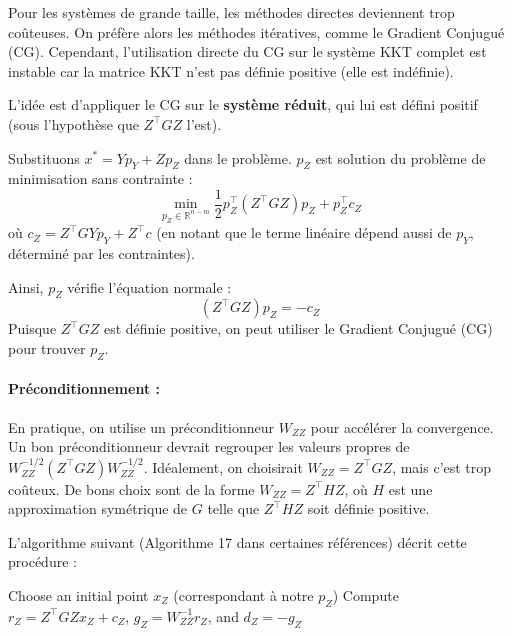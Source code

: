Pour les systèmes de grande taille, les méthodes directes deviennent trop coûteuses. On préfère alors les méthodes itératives, comme le Gradient Conjugué (CG).
Cependant, l'utilisation directe du CG sur le système KKT complet est instable car la matrice KKT n'est pas définie positive (elle est indéfinie).

L'idée est d'appliquer le CG sur le \textbf{système réduit}, qui lui est défini positif (sous l'hypothèse que $Z^\top G Z$ l'est).

Substituons $x^* = Y p_Y + Z p_Z$ dans le problème.
$p_Z$ est solution du problème de minimisation sans contrainte :
\begin{equation}
    \min_{p_Z \in \mathbb{R}^{n-m}} \frac{1}{2} p_Z^\top (Z^\top G Z) p_Z + p_Z^\top c_Z
\end{equation}
où $c_Z = Z^\top G Y p_Y + Z^\top c$ (en notant que le terme linéaire dépend aussi de $p_Y$, déterminé par les contraintes).

Ainsi, $p_Z$ vérifie l'équation normale :
\begin{equation}
    (Z^\top G Z) p_Z = -c_Z
\end{equation}
Puisque $Z^\top G Z$ est définie positive, on peut utiliser le Gradient Conjugué (CG) pour trouver $p_Z$.

\paragraph{Préconditionnement :}
En pratique, on utilise un préconditionneur $W_{ZZ}$ pour accélérer la convergence. Un bon préconditionneur devrait regrouper les valeurs propres de $W_{ZZ}^{-1/2} (Z^\top G Z) W_{ZZ}^{-1/2}$.
Idéalement, on choisirait $W_{ZZ} = Z^\top G Z$, mais c'est trop coûteux.
De bons choix sont de la forme $W_{ZZ} = Z^\top H Z$, où $H$ est une approximation symétrique de $G$ telle que $Z^\top H Z$ soit définie positive.

L'algorithme suivant (Algorithme 17 dans certaines références) décrit cette procédure :

\begin{algorithm}[H]
    \caption{Preconditioned Conjugate Gradient for reduced systems}
    \SetAlgoLined
    Choose an initial point $x_Z$ (correspondant à notre $p_Z$)\;
    Compute $r_Z=Z^\top GZx_Z + c_Z$, $g_Z=W_{ZZ}^{-1}r_Z$, and $d_Z=-g_Z$\;
\end{algorithm}

